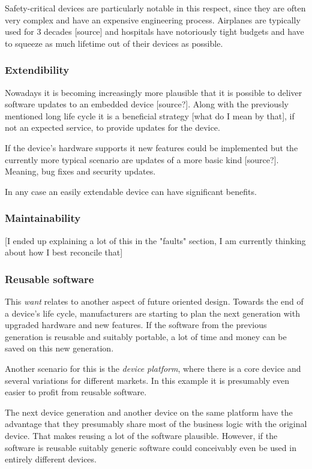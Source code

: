 Safety-critical devices are particularly notable in this respect, since they are often very complex and have an expensive engineering process. Airplanes are typically used for 3 decades [source] and hospitals have notoriously tight budgets and have to squeeze as much lifetime out of their devices as possible. 
\subsubsection{Extendibility}
Nowadays it is becoming increasingly more plausible that it is possible to deliver software updates to an embedded device [source?]. Along with the previously mentioned long life cycle it is a beneficial strategy [what do I mean by that], if not an expected service, to provide updates for the device.

If the device's hardware supports it new features could be implemented but the currently more typical scenario are updates of a more basic kind [source?]. Meaning, bug fixes and security updates.

In any case an easily extendable device can have significant benefits.
\subsubsection{Maintainability}
[I ended up explaining a lot of this in the "faults" section, I am currently thinking about how I best reconcile that]
\subsubsection{Reusable software}
This \textit{want} relates to another aspect of future oriented design. Towards the end of a device's life cycle, manufacturers are starting to plan the next generation with upgraded hardware and new features. If the software from the previous generation is reusable and suitably portable, a lot of time and money can be saved on this new generation.

Another scenario for this is the \textit{device platform}, where there is a core device and several variations for different markets. In this example it is presumably even easier to profit from reusable software.

The next device generation and another device on the same platform have the advantage that they presumably share most of the business logic with the original device. That makes reusing a lot of the software plausible. However, if the software is reusable suitably generic software could conceivably even be used in entirely different devices.

